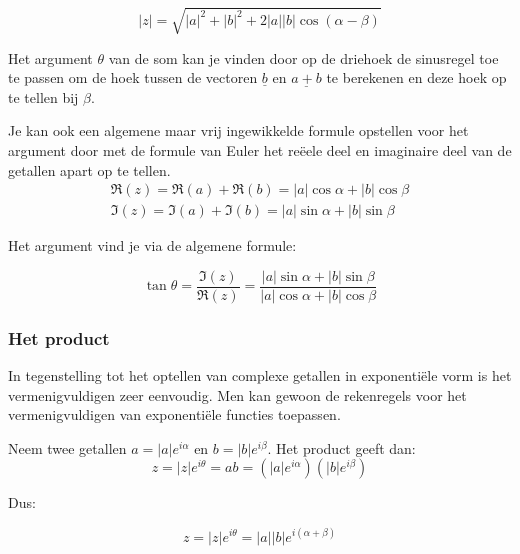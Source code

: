 \begin{eigenschap}
	\begin{framed}
	\[ |z|=\sqrt{|a|^2 +|b|^2 +2|a||b|\cos(\alpha-\beta)} \]
\end{framed}
\end{eigenschap}

Het argument $\theta$ van de som  kan je vinden door op de driehoek de sinusregel toe te passen om de hoek tussen de vectoren $\underline{b}$ en $\underline{a+b}$ te berekenen en deze hoek op te tellen bij $\beta$.\\

\vspace{0.2cm}

Je kan ook een algemene maar vrij ingewikkelde formule opstellen voor het argument door met de formule van Euler het re\"{e}ele deel en imaginaire deel van de getallen apart op te tellen.\\

\[  \begin{array}{l}  
\Re(z)=\Re(a)+\Re(b)=|a|\cos \alpha + |b|\cos \beta \\
\Im(z)=\Im(a)+\Im(b)=|a|\sin \alpha + |b|\sin \beta  \end{array} \] 

Het argument vind je via de algemene formule:\\

\begin{eigenschap}
	\begin{framed}
	\[ \tan \theta =\frac{\Im(z)}{\Re(z)}=\frac{|a|\sin \alpha + |b|\sin \beta}{|a|\cos \alpha + |b|\cos \beta}   \]
\end{framed}
\end{eigenschap}

\subsubsection{Het product}

In tegenstelling tot het optellen van complexe getallen in exponenti\"{e}le vorm is het vermenigvuldigen zeer eenvoudig. Men kan gewoon de rekenregels voor het vermenigvuldigen van exponenti\"{e}le functies toepassen.\\

\vspace{0.2cm}

\begin{eigenschap}
	Neem twee getallen $a=|a|e^{i\alpha}$ en $b=|b|e^{i \beta}$. Het product geeft dan:\\

\[  z=|z|e^{i \theta}=ab=(|a|e^{i\alpha})(|b|e^{i \beta})  \]

Dus:\\

\begin{framed}
	\[ z=|z|e^{i \theta}=|a||b|e^{i (\alpha + \beta)}       \]
\end{framed}
\end{eigenschap}

